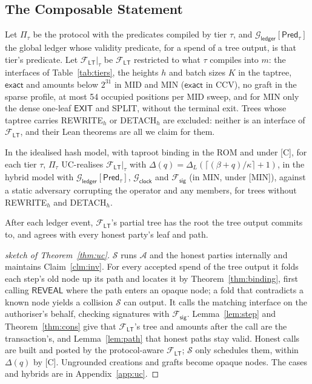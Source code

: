 \documentclass[runningheads]{llncs}
\newif\iffullversion
\newcommand{\lifted}[1]{\iffullversion\S\ref{#1}\else Appendix~\ref{#1}\fi}
\newcommand{\tr}[1]{\textsf{#1}}
\newcommand{\Ftree}{\ensuremath{\mathcal{F}_{\mathsf{LT}}}}
\newcommand{\Gledger}{\ensuremath{\mathcal{G}_{\mathsf{ledger}}}}
\newcommand{\Gclock}{\ensuremath{\mathcal{G}_{\mathsf{clock}}}}
\newcommand{\Fsig}{\ensuremath{\mathcal{F}_{\mathsf{sig}}}}
\newcommand{\Sim}{\ensuremath{\mathcal{S}}}
\newcommand{\Adv}{\ensuremath{\mathcal{A}}}
\newcommand{\Pred}{\ensuremath{\mathsf{Pred}}}
\newcommand{\iface}[1]{\ensuremath{\mathsf{#1}}}
\newcommand{\lat}{\ensuremath{\Delta}}
\begin{document}
\subsection{The Composable Statement}

Let $\Pi_\tau$ be the protocol with the predicates compiled by tier
$\tau$, and $\Gledger[\Pred_\tau]$ the global ledger whose validity
predicate, for a spend of a tree output, is that tier's predicate. Let
$\Ftree|_\tau$ be $\Ftree$ restricted to what $\tau$ compiles into $m$:
the interfaces of Table~\ref{tab:tiers}, the heights $h$ and batch sizes
$K$ in the taptree, $\mathsf{exact}$ and amounts below $2^{31}$ in MID
and MIN ($\mathsf{exact}$ in CCV), no graft in the sparse profile, at
most 54 occupied positions per MID sweep, and for MIN only the dense
one-leaf \iface{EXIT} and \tr{SPLIT}, without the terminal exit. Trees
whose taptree carries \tr{REWRITE}$_h$ or \tr{DETACH}$_h$ are excluded:
neither is an interface of $\Ftree$, and their Lean theorems are all we
claim for them.

\begin{theorem}[UC realisation]\label{thm:uc}
In the idealised hash model, with taproot binding in the ROM and under
[C], for each tier $\tau$, $\Pi_\tau$ UC-realises $\Ftree|_\tau$ with
$\lat(q) = \lat_L(\lceil (\beta + q)/\kappa \rceil + 1)$, in the hybrid
model with $\Gledger[\Pred_\tau]$, $\Gclock$ and $\Fsig$ (in MIN, under
[MIN]), against a static adversary corrupting the operator and any
members, for trees without \tr{REWRITE}$_h$ and \tr{DETACH}$_h$.
\end{theorem}

\begin{simclaim}\label{clm:inv}
After each ledger event, $\Ftree$'s partial tree has the root the tree
output commits to, and agrees with every honest party's leaf and path.
\end{simclaim}

\iffullversion
The proof is the next section.
\else
\begin{proof}[sketch of Theorem~\ref{thm:uc}]
$\Sim$ runs $\Adv$ and the honest parties internally and maintains
Claim~\ref{clm:inv}. For every accepted spend of the tree output it folds
each step's old node up its path and locates it by
Theorem~\ref{thm:binding}, first calling \iface{REVEAL} where the path
enters an opaque node; a fold that contradicts a known node yields a
collision $\Sim$ can output. It calls the matching interface on the
authoriser's behalf, checking signatures with $\Fsig$.
Lemma~\ref{lem:step} and Theorem~\ref{thm:cons} give that $\Ftree$'s
tree and amounts after the call are the transaction's, and
Lemma~\ref{lem:path} that honest paths stay valid. Honest calls are built
and posted by the protocol-aware $\Ftree$; $\Sim$ only schedules them,
within $\lat(q)$ by [C]. Ungrounded creations and grafts become opaque
nodes. The cases and hybrids are in \lifted{app:uc}.
\end{proof}
\fi
\end{document}
